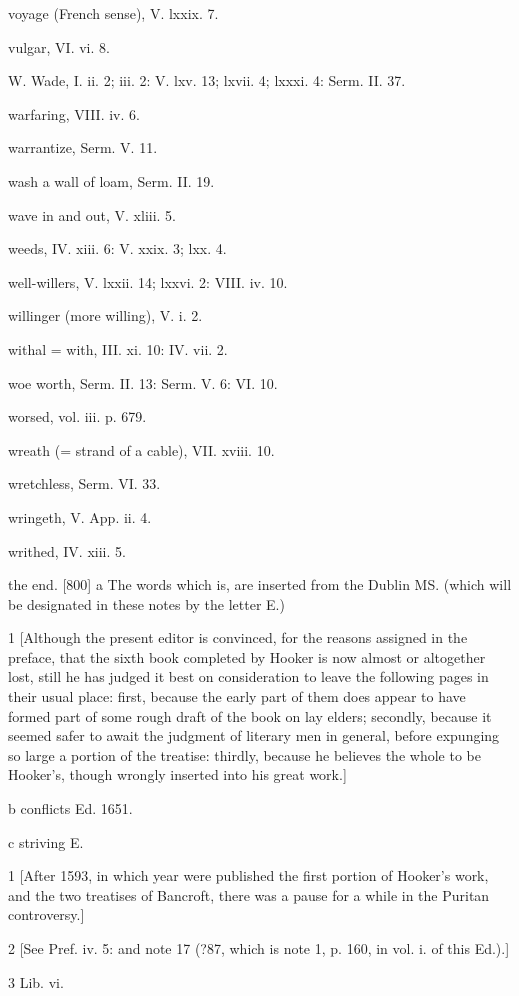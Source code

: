 voyage (French sense), V. lxxix. 7.

vulgar, VI. vi. 8.

W.
Wade, I. ii. 2; iii. 2: V. lxv. 13; lxvii. 4; lxxxi. 4: Serm. II. 37.

warfaring, VIII. iv. 6.

warrantize, Serm. V. 11.

wash a wall of loam, Serm. II. 19.

wave in and out, V. xliii. 5.

weeds, IV. xiii. 6: V. xxix. 3; lxx. 4.

well-willers, V. lxxii. 14; lxxvi. 2: VIII. iv. 10.

willinger (more willing), V. i. 2.

withal = with, III. xi. 10: IV. vii. 2.

woe worth, Serm. II. 13: Serm. V. 6: VI. 10.

worsed, vol. iii. p. 679.

wreath (= strand of a cable), VII. xviii. 10.

wretchless, Serm. VI. 33.

wringeth, V. App. ii. 4.

writhed, IV. xiii. 5.

the end.
[800]
a
The words which is, are inserted from the Dublin MS. (which will be designated in these notes by the letter E.)

1
[Although the present editor is convinced, for the reasons assigned in the preface, that the sixth book completed by Hooker is now almost or altogether lost, still he has judged it best on consideration to leave the following pages in their usual place: first, because the early part of them does appear to have formed part of some rough draft of the book on lay elders; secondly, because it seemed safer to await the judgment of literary men in general, before expunging so large a portion of the treatise: thirdly, because he believes the whole to be Hooker’s, though wrongly inserted into his great work.]

b
conflicts Ed. 1651.

c
striving E.

1
[After 1593, in which year were published the first portion of Hooker’s work, and the two treatises of Bancroft, there was a pause for a while in the Puritan controversy.]

2
[See Pref. iv. 5: and note 17 (?87, which is note 1, p. 160, in vol. i. of this Ed.).]

3
Lib. vi.

